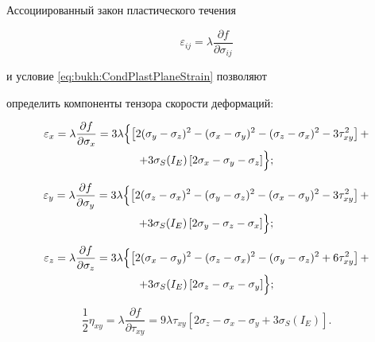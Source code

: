 Ассоциированный закон пластического течения

$$\varepsilon_{ij}=\lambda\dfrac{\partial f}{\partial\sigma_{ij}}$$

и условие \eqref{eq:bukh:CondPlastPlaneStrain} позволяют

определить компоненты тензора скорости деформаций:

\begin{multline*}

\varepsilon_x=\lambda\frac{\partial f}{\partial\sigma_x}=

3\lambda\Bigl\{\left[2(\sigma_y-\sigma_z)^2-(\sigma_x-\sigma_y)^2-(\sigma_z-\sigma_x)^2-3\tau_{xy}^2\right]+ \\

+

3\sigma_S(I_E)\left[2\sigma_x-\sigma_y-\sigma_z\right]\Bigr\};

\end{multline*}

\begin{multline*}

\varepsilon_y=\lambda\frac{\partial f}{\partial\sigma_y}=

3\lambda\Bigl\{\left[2(\sigma_z-\sigma_x)^2-(\sigma_y-\sigma_z)^2-(\sigma_x-\sigma_y)^2-

3\tau_{xy}^2\right]+ \\

+3\sigma_S(I_E)\left[2\sigma_y-\sigma_z-\sigma_x\right]\Bigr\};

\end{multline*}

\begin{multline*}

\varepsilon_z=\lambda\frac{\partial f}{\partial\sigma_z}=

3\lambda\Bigl\{\left[2(\sigma_x-\sigma_y)^2-(\sigma_z-\sigma_x)^2-(\sigma_y-\sigma_z)^2+

6\tau_{xy}^2\right]+ \\

+3\sigma_S(I_E)\left[2\sigma_z-\sigma_x-\sigma_y\right]\Bigr\};

\end{multline*}

\begin{equation}

\label{eq:bukh:VelocityStrainTensor}

\frac{1}{2}\eta_{xy}=\lambda\frac{\partial

f}{\partial\tau_{xy}}=9\lambda\tau_{xy}\left[2\sigma_z-\sigma_x-\sigma_y+3\sigma_S(I_E)\right].

\end{equation}




